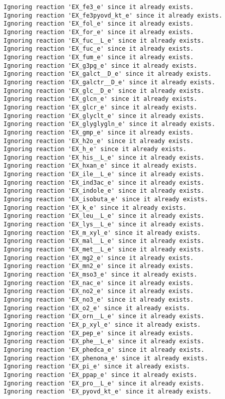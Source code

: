 \documentclass[
  letterpaper,
  DIV=11,
  numbers=noendperiod]{scrartcl}
\begin{document}
\begin{verbatim}
Ignoring reaction 'EX_fe3_e' since it already exists.
Ignoring reaction 'EX_fe3pyovd_kt_e' since it already exists.
Ignoring reaction 'EX_fol_e' since it already exists.
Ignoring reaction 'EX_for_e' since it already exists.
Ignoring reaction 'EX_fuc__L_e' since it already exists.
Ignoring reaction 'EX_fuc_e' since it already exists.
Ignoring reaction 'EX_fum_e' since it already exists.
Ignoring reaction 'EX_g3pg_e' since it already exists.
Ignoring reaction 'EX_galct__D_e' since it already exists.
Ignoring reaction 'EX_galctr__D_e' since it already exists.
Ignoring reaction 'EX_glc__D_e' since it already exists.
Ignoring reaction 'EX_glcn_e' since it already exists.
Ignoring reaction 'EX_glcr_e' since it already exists.
Ignoring reaction 'EX_glyclt_e' since it already exists.
Ignoring reaction 'EX_glyglygln_e' since it already exists.
Ignoring reaction 'EX_gmp_e' since it already exists.
Ignoring reaction 'EX_h2o_e' since it already exists.
Ignoring reaction 'EX_h_e' since it already exists.
Ignoring reaction 'EX_his__L_e' since it already exists.
Ignoring reaction 'EX_hxan_e' since it already exists.
Ignoring reaction 'EX_ile__L_e' since it already exists.
Ignoring reaction 'EX_ind3ac_e' since it already exists.
Ignoring reaction 'EX_indole_e' since it already exists.
Ignoring reaction 'EX_isobuta_e' since it already exists.
Ignoring reaction 'EX_k_e' since it already exists.
Ignoring reaction 'EX_leu__L_e' since it already exists.
Ignoring reaction 'EX_lys__L_e' since it already exists.
Ignoring reaction 'EX_m_xyl_e' since it already exists.
Ignoring reaction 'EX_mal__L_e' since it already exists.
Ignoring reaction 'EX_met__L_e' since it already exists.
Ignoring reaction 'EX_mg2_e' since it already exists.
Ignoring reaction 'EX_mn2_e' since it already exists.
Ignoring reaction 'EX_mso3_e' since it already exists.
Ignoring reaction 'EX_nac_e' since it already exists.
Ignoring reaction 'EX_no2_e' since it already exists.
Ignoring reaction 'EX_no3_e' since it already exists.
Ignoring reaction 'EX_o2_e' since it already exists.
Ignoring reaction 'EX_orn__L_e' since it already exists.
Ignoring reaction 'EX_p_xyl_e' since it already exists.
Ignoring reaction 'EX_pep_e' since it already exists.
Ignoring reaction 'EX_phe__L_e' since it already exists.
Ignoring reaction 'EX_phedca_e' since it already exists.
Ignoring reaction 'EX_phenona_e' since it already exists.
Ignoring reaction 'EX_pi_e' since it already exists.
Ignoring reaction 'EX_ppap_e' since it already exists.
Ignoring reaction 'EX_pro__L_e' since it already exists.
Ignoring reaction 'EX_pyovd_kt_e' since it already exists.

\end{verbatim}
\end{document}
